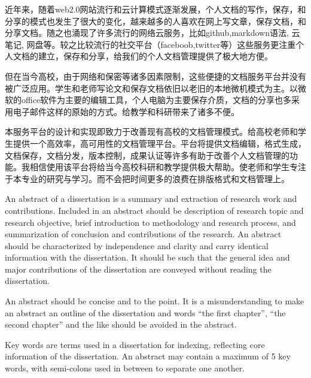 
\begin{cabstract}
近年来，随着web2.0网站流行和云计算模式逐渐发展，个人文档的写作，保存，和分享的模式也发生了很大的变化，越来越多的人喜欢在网上写文章，保存文档，和分享文档。随之也涌现了许多流行的网络云服务，比如github,markdown语法, 云笔记, 网盘等。较之比较流行的社交平台（faceboob,twitter等）这些服务更注重个人文档的建立，保存和分享，给我们的个人文档管理提供了极大地方便。

但在当今高校，由于网络和保密等诸多因素限制，这些便捷的文档服务平台并没有被广泛应用。学生和老师写论文和保存文档依旧以老旧的本地微机模式为主。以微软的office软件为主要的编辑工具，个人电脑为主要保存介质，文档的分享也多采用电子邮件这样的原始的方式。给教学和科研带来了诸多不便。

本服务平台的设计和实现即致力于改善现有高校的文档管理模式。给高校老师和学生提供一个高效率，高可用性的文档管理平台。平台将提供文档编辑，格式生成，文档保存，文档分发，版本控制，成果认证等许多有助于改善个人文档管理的功能。我相信使用该平台将给当今高校科研和教学提供极大帮助。使老师和学生专注于本专业的研究与学习。而不会把时间更多的浪费在排版格式和文档管理上。
\end{cabstract}


\begin{eabstract} 
   An abstract of a dissertation is a summary and extraction of research work
   and contributions. Included in an abstract should be description of research
   topic and research objective, brief introduction to methodology and research
   process, and summarization of conclusion and contributions of the
   research. An abstract should be characterized by independence and clarity and
   carry identical information with the dissertation. It should be such that the
   general idea and major contributions of the dissertation are conveyed without
   reading the dissertation. 

   An abstract should be concise and to the point. It is a misunderstanding to
   make an abstract an outline of the dissertation and words ``the first
   chapter'', ``the second chapter'' and the like should be avoided in the
   abstract.

   Key words are terms used in a dissertation for indexing, reflecting core
   information of the dissertation. An abstract may contain a maximum of 5 key
   words, with semi-colons used in between to separate one another.
\end{eabstract}

